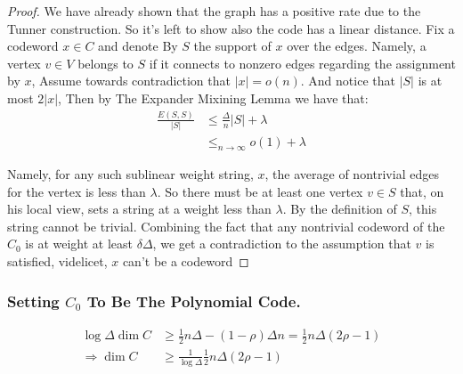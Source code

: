   \begin{proof} We have already shown that the graph has a positive rate due to the Tunner construction. So it's left to show also the code has a linear distance. Fix a codeword $x \in C$ and denote By $S$ the support of $x$ over the edges. Namely, a vertex $v\in V$ belongs to $S$ if it connects to nonzero edges regarding the assignment by $x$, Assume towards contradiction that $|x| = o\left( n \right)$. And notice that $|S|$ is at most $2|x|$, Then by The Expander Mixining Lemma we have that: 
  \begin{equation*}
    \begin{split}
      \frac{E\left( S,S \right)}{|S|} & \le \frac{\Delta}{n}|S|  + \lambda \\
      & \le_{ n \rightarrow \infty} o\left( 1 \right) + \lambda
    \end{split}
  \end{equation*}

  Namely, for any such sublinear weight string, $x$, the average of nontrivial edges for the vertex is less than $\lambda$. So there must be at least one vertex $v \in S$ that, on his local view, sets a  string at a weight less than $\lambda$. By the definition of $S$, this string cannot be trivial. Combining the fact that any nontrivial codeword of the $C_{0}$ is at weight at least $\delta\Delta$, we get a contradiction to the assumption that $v$ is satisfied, videlicet, $x$ can't be a codeword \end{proof}

  \subsubsection{Setting $C_{0}$ To Be The Polynomial Code.}
  
  \begin{equation*}
    \begin{split}
     \log \Delta \dim C & \ge \frac{1}{2}n\Delta  - \left( 1- \rho  \right) \Delta n = \frac{1}{2}n\Delta\left( 2\rho - 1 \right)  \\
     \Rightarrow  \dim C & \ge \frac{1}{\log \Delta} \frac{1}{2}n\Delta\left( 2\rho - 1 \right)  
    \end{split}
  \end{equation*}

